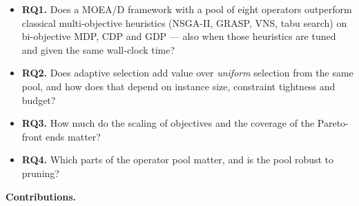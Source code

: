 \begin{itemize}
\item \textbf{RQ1.} Does a MOEA/D framework with a pool of eight operators outperform classical multi-objective heuristics (NSGA-II, GRASP, VNS, tabu search) on bi-objective MDP, CDP and GDP --- also when those heuristics are tuned and given the same wall-clock time?
\item \textbf{RQ2.} Does adaptive selection add value over \emph{uniform} selection from the same pool, and how does that depend on instance size, constraint tightness and budget?
\item \textbf{RQ3.} How much do the scaling of objectives and the coverage of the Pareto-front ends matter?
\item \textbf{RQ4.} Which parts of the operator pool matter, and is the pool robust to pruning?
\end{itemize}

\textbf{Contributions.}


